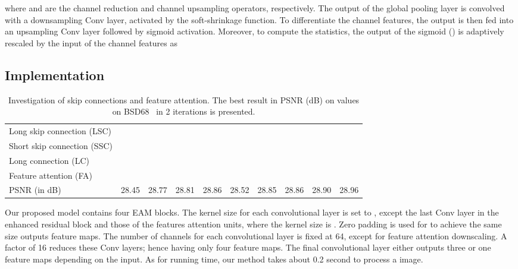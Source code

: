 \documentclass[10pt,twocolumn,letterpaper]{article}
\newcommand{\ch}{\checkmark}
\begin{document}
where  and  are the channel reduction and channel upsampling operators, respectively. The output of the global pooling layer  is convolved with a downsampling Conv layer, activated by the soft-shrinkage function. To differentiate the channel features, the output is then fed into an upsampling Conv layer followed by sigmoid activation.   Moreover, to compute the statistics, the output of the sigmoid () is adaptively rescaled by the input  of the channel features as 


\subsection{Implementation}

\begin{table*}
\centering
\begin{tabular}{l||c|c|c|c|c|c|c|c|c}
\hline\hline
 Long skip connection (LSC)     &      & \ch   & 	  &  \ch &       &        &       &  \ch   &\ch \\ 
  Short skip connection (SSC)   &      &  	   & \ch  &  \ch &       &        & \ch   &  \ch   &\ch \\  
  Long connection (LC)          &      &  	   & 	  &      &       & \ch          & \ch   &        &\ch \\
 Feature attention (FA)         &      &  	   & 	  &      &  \ch  & \ch       & \ch   & \ch    &\ch \\  \hline
 PSNR (in dB)  &28.45 & 28.77 &28.81 &28.86 & 28.52 &28.85  & 28.86 & 28.90 &28.96 \\  \hline \hline
\end{tabular}
\caption{ Investigation of skip connections and feature attention. The best result in PSNR (dB) on values on BSD68~\cite{roth2009fields} in 2 iterations is presented.}
\label{table:ablation}
\vspace*{-5mm}
\end{table*}
Our proposed model contains four EAM blocks. The kernel size for each convolutional layer is set to , except the last Conv layer in the enhanced residual block and those of the features attention units, where the kernel size is . Zero padding is used for  to achieve the same size outputs feature maps. The number of channels for each convolutional layer is fixed at 64, except for feature attention downscaling. A factor of 16 reduces these Conv layers; hence having only four feature maps. The final convolutional layer either outputs three or one feature maps depending on the input. As for running time, our method takes about 0.2 second to process a  image.
\end{document}

